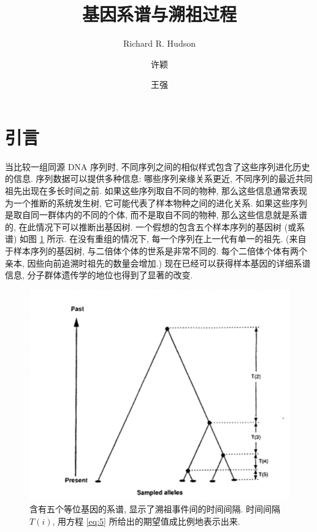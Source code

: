 \documentclass[12pt]{article}
\title{基因系谱与溯祖过程}
\author{Richard R. Hudson \and 许颖 \and 王强}
\institute{University of Chicago \and 南京大学生命科学学院}
\begin{document}
\maketitle

{
    \setcounter{tocdepth}{3}
    \tableofcontents
}

\section{引言}

当比较一组同源 DNA 序列时, 不同序列之间的相似样式包含了这些序列进化历史的信息. 序列数据可以提供多种信息:
哪些序列亲缘关系更近, 不同序列的最近共同祖先出现在多长时间之前. 如果这些序列取自不同的物种,
那么这些信息通常表现为一个推断的系统发生树, 它可能代表了样本物种之间的进化关系.
如果这些序列是取自同一群体内的不同的个体, 而不是取自不同的物种, 那么这些信息就是系谱的,
在此情况下可以推断出基因树. 一个假想的包含五个样本序列的基因树 (或系谱) 如图 \ref{fig:1} 所示.
在没有重组的情况下, 每一个序列在上一代有单一的祖先. (来自于样本序列的基因树,
与二倍体个体的世系是非常不同的. 每个二倍体个体有两个亲本, 因些向前追溯时祖先的数量会增加.)
现在已经可以获得样本基因的详细系谱信息, 分子群体遗传学的地位也得到了显著的改变.

\begin{figure}
    \centering
    \includegraphics{coalescent-process.images/image1.png}
    \caption{含有五个等位基因的系谱, 显示了溯祖事件间的时间间隔.
        时间间隔 $T(i)$, 用方程 \ref{eq:5} 所给出的期望值成比例地表示出来.}
    \label{fig:1}
\end{figure}
\end{document}
